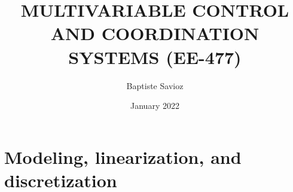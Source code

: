 \documentclass{article}
\title{MULTIVARIABLE CONTROL AND
COORDINATION SYSTEMS
(EE-477)
}
\author{Baptiste Savioz }
\date{January 2022}
\begin{document}
\label{page:titre}


\newpage
\tableofcontents
\newpage


\section{Modeling, linearization, and discretization}
\label{sec:modeling}




\newpage
\printbibliography 
\end{document}
